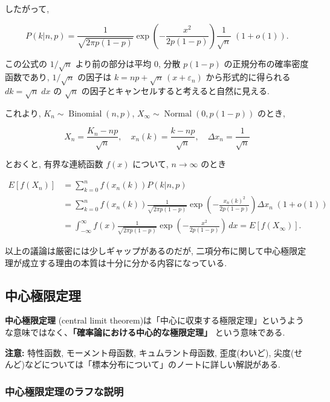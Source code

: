 \documentclass[10pt, a4paper,xelatex,ja=standard]{bxjsarticle}
\newcommand\op{\operatorname}
\newcommand\eps{\varepsilon}
\begin{document}
したがって,

\[
P(k|n,p) =
\frac{1}{\sqrt{2\pi p(1-p)}}
\exp\left(-\frac{x^2}{2p(1-p)}\right)
\frac{1}{\sqrt{n}}
\;(1 + o(1)).
\]

この公式の \(1/\sqrt{n}\) より前の部分は平均 \(0\), 分散 \(p(1-p)\)
の正規分布の確率密度函数であり, \(1/\sqrt{n}\) の因子は
\(k = np + \sqrt{n}\,(x + \eps_n)\) から形式的に得られる
\(dk = \sqrt{n}\;dx\) の \(\sqrt{n}\)
の因子とキャンセルすると考えると自然に見える.

これより, \(K_n \sim \op{Binomial}(n, p)\),
\(X_\infty \sim \op{Normal}(0, p(1-p))\) のとき,

\[
X_n = \frac{K_n - np}{\sqrt{n}}, \quad
x_n(k) = \frac{k - np}{\sqrt{n}}, \quad
\varDelta x_n = \frac{1}{\sqrt{n}}
\]

とおくと, 有界な連続函数 \(f(x)\) について, \(n\to\infty\) のとき

\[
\begin{aligned}
E[f(X_n)] &=
\sum_{k=0}^n f(x_n(k)) P(k|n,p)
\\ &=
\sum_{k=0}^n f(x_n(k))
\frac{1}{\sqrt{2\pi p(1-p)}}
\exp\left(-\frac{x_n(k)^2}{2p(1-p)}\right)
\varDelta x_n \;(1 + o(1))
\\ &=
\int_{-\infty}^\infty f(x)
\frac{1}{\sqrt{2\pi p(1-p)}}
\exp\left(-\frac{x^2}{2p(1-p)}\right)\,dx =
E[f(X_\infty)].
\end{aligned}
\]

以上の議論は厳密には少しギャップがあるのだが,
二項分布に関して中心極限定理が成立する理由の本質は十分に分かる内容になっている.

    \hypertarget{ux4e2dux5fc3ux6975ux9650ux5b9aux7406}{%
\subsection{中心極限定理}\label{ux4e2dux5fc3ux6975ux9650ux5b9aux7406}}

\textbf{中心極限定理} (central limit
theorem)は「中心に収束する極限定理」というような意味ではなく、\textbf{「確率論における中心的な極限定理」}
という意味である.

\textbf{注意:} 特性函数, モーメント母函数, キュムラント母函数,
歪度(わいど),
尖度(せんど)などについては「標本分布について」のノートに詳しい解説がある.

    \hypertarget{ux4e2dux5fc3ux6975ux9650ux5b9aux7406ux306eux30e9ux30d5ux306aux8aacux660e}{%
\subsubsection{中心極限定理のラフな説明}\label{ux4e2dux5fc3ux6975ux9650ux5b9aux7406ux306eux30e9ux30d5ux306aux8aacux660e}}
\end{document}
